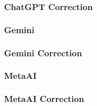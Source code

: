 \subsubsection{ChatGPT Correction}
\begin{tcolorbox}[breakable]
    
\end{tcolorbox}
\subsubsection{Gemini}
\begin{tcolorbox}[breakable]
    
\end{tcolorbox}
\subsubsection{Gemini Correction}
\begin{tcolorbox}[breakable]
    
\end{tcolorbox}
\subsubsection{MetaAI}
\begin{tcolorbox}[breakable]
    
\end{tcolorbox}
\subsubsection{MetaAI Correction}
\begin{tcolorbox}[breakable]
    
\end{tcolorbox}
\pagebreak